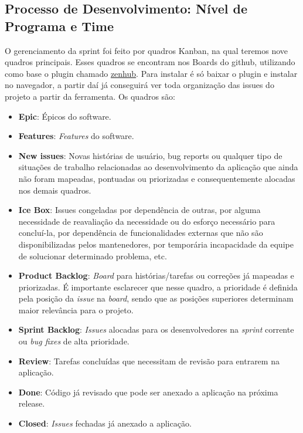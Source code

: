 \subsection{Processo de Desenvolvimento: Nível de Programa e Time}

O gerenciamento da sprint foi feito por quadros Kanban, na qual teremos nove quadros principais. Esses quadros se encontram nos Boards do github, utilizando como base o plugin chamado \href{https://www.zenhub.com/}{zenhub}. Para instalar é só baixar o plugin e instalar no navegador, a partir daí já conseguirá ver toda organização das issues do projeto a partir da ferramenta. Os quadros são:

\begin{itemize}
  \item \textbf{Epic}: Épicos do software.
  \item \textbf{Features}: \textit{Features} do software.
  \item \textbf{New issues}: Novas histórias de usuário, bug reports ou qualquer tipo de situações de trabalho relacionadas ao desenvolvimento da aplicação que ainda não foram mapeadas, pontuadas ou priorizadas e consequentemente alocadas nos demais quadros.
  \item \textbf{Ice Box}: Issues congeladas por dependência de outras, por alguma necessidade de reavaliação da necessidade ou do esforço necessário para concluí-la, por dependência de funcionalidades externas que não são disponibilizadas pelos mantenedores, por temporária incapacidade da equipe de solucionar determinado problema, etc.
  \item \textbf{Product Backlog}: \textit{Board} para histórias/tarefas ou correções já mapeadas e priorizadas. É importante esclarecer que nesse quadro, a prioridade é definida pela posição da \textit{issue} na \textit{board}, sendo que as posições superiores determinam maior relevância para o projeto.
  \item \textbf{Sprint Backlog}: \textit{Issues} alocadas para os desenvolvedores na \textit{sprint} corrente ou \textit{bug fixes} de alta prioridade.
  \item \textbf{Review}: Tarefas concluídas que necessitam de revisão para entrarem na aplicação.
  \item \textbf{Done}: Código já revisado que pode ser anexado a aplicação na próxima release.
  \item \textbf{Closed}: \textit{Issues} fechadas já anexado a aplicação.
\end{itemize}

